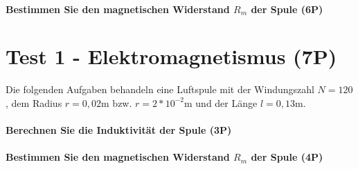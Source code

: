 \documentclass{article}
\begin{document}
\subsection*{Bestimmen Sie den magnetischen Widerstand $R_{m}$ der Spule (6P)}


\vspace{\baselineskip}



\part*{Test 1 - Elektromagnetismus (7P)}

Die folgenden Aufgaben behandeln eine Luftspule mit der Windungszahl $N=120$, dem Radius $r=0{,}02$m bzw. $r=2*10^{ -2 }$m und der Länge $l=0{,}13$m.

\subsection*{Berechnen Sie die Induktivität der Spule (3P)}


\vspace{\baselineskip}\vspace{\baselineskip}\vspace{\baselineskip}

\subsection*{Bestimmen Sie den magnetischen Widerstand $R_{m}$ der Spule (4P)}


\vspace{\baselineskip}
\end{document}
